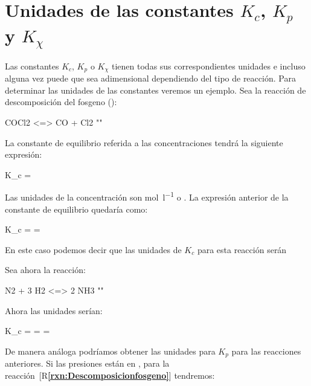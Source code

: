 \section{Unidades de las constantes \texorpdfstring{\(K_c\)}{Kc}, \texorpdfstring{\(K_p\)}{Kp} y  \texorpdfstring{\(K_{\chi}\)}{Kx}}

Las constantes {\(K_c\)}, {\(K_p\)} o {\(K_{\chi}\)} tienen todas sus correspondientes unidades e incluso alguna vez puede que sea adimensional dependiendo del tipo de reacción.
Para determinar las unidades de las constantes veremos un ejemplo.
Sea la reacción de descomposición del fosgeno ():

\begin{reaction}
    COCl2 \gas{} <=> CO \gas{} + Cl2 \gas{}
    "\label{rxn:Descomposicionfosgeno}"
\end{reaction}

La constante de equilibrio referida a las concentraciones tendrá la siguiente expresión:

\begin{centeredequation}
    K_c = 
\end{centeredequation}

Las unidades de la concentración son \si{\mole\per\litre} o \si{\M}.
La expresión anterior de la constante de equilibrio quedaría como:
\begin{centeredequation}
    K_c = \dfrac{\si{\M}\ \cancelred{\si{\M}}}{\cancelred{\si{\M}}} = \si{\M}
\end{centeredequation}

En este caso podemos decir que las unidades de \( K_c \) para esta reacción serán \si{\M}

Sea ahora la reacción:

\begin{reaction}
    N2 \gas{} + 3 H2 \gas{} <=> 2 NH3 \gas{}
    "\label{rxn:descomposicionamoniaco}"
\end{reaction}

Ahora las unidades serían:

\begin{centeredequation}
    K_c =  =  = 
\end{centeredequation}

De manera análoga podríamos obtener las unidades para \( K_p \) para las reacciones anteriores.
Si las presiones están en \si{\atmosphere}, para la reacción~[R\textcolor{blue}{\textbf{\ref{rxn:Descomposicionfosgeno}}}] tendremos:

